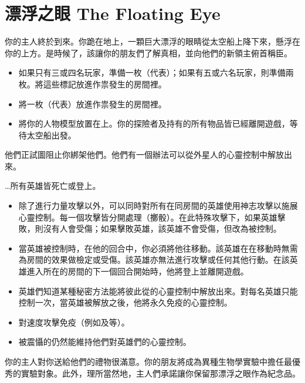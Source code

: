 
\chapter{漂浮之眼 The Floating Eye}

\begin{HauntStory}
  你的主人終於到來。你跪在地上，一顆巨大漂浮的眼睛從太空船上降下來，懸浮在你的上方。是時候了，該讓你的朋友們了解真相，並向他們的新領主俯首稱臣。
\end{HauntStory}

\vspace*{-1em}
\begin{itemize}
  \item 如果只有三或四名玩家，準備一枚（代表）；如果有五或六名玩家，則準備兩枚。將這些標記放進作祟發生的房間裡。
  \item 將一枚（代表）放進作祟發生的房間裡。
  \item 將你的人物模型放置在上。你的探險者及持有的所有物品皆已經離開遊戲，等待太空船出發。
\end{itemize}

他們正試圖阻止你綁架他們。他們有一個辦法可以從外星人的心靈控制中解放出來。

…所有英雄皆死亡或登上。

\vfill\null\pagebreak


\vspace*{-1em}
\begin{itemize}
  \item 除了進行力量攻擊以外，可以同時對所有在同房間的英雄使用神志攻擊以施展心靈控制。每一個攻擊皆分開處理（擲骰）。在此特殊攻擊下，如果英雄擊敗，則沒有人會受傷；如果擊敗英雄，該英雄不會受傷，但改為被控制。
  \item 當英雄被控制時，在他的回合中，你必須將他往移動。該英雄在在移動時無需為房間的效果做檢定或受傷。該英雄亦無法進行攻擊或任何其他行動。在該英雄進入所在的房間的下一個回合開始時，他將登上並離開遊戲。
  \item 英雄們知道某種秘密方法能將彼此從的心靈控制中解放出來。對每名英雄只能控制一次，當英雄被解放之後，他將永久免疫的心靈控制。
  \item {}對速度攻擊免疫（例如及等）。
  \item 被震懾的仍然能維持他們對英雄們的心靈控制。
\end{itemize}

\begin{HauntStory}
  你的主人對你送給他們的禮物很滿意。你的朋友將成為異種生物學實驗中擔任最優秀的實驗對象。此外，理所當然地，主人們承諾讓你保留那漂浮之眼作為紀念品。
\end{HauntStory}
